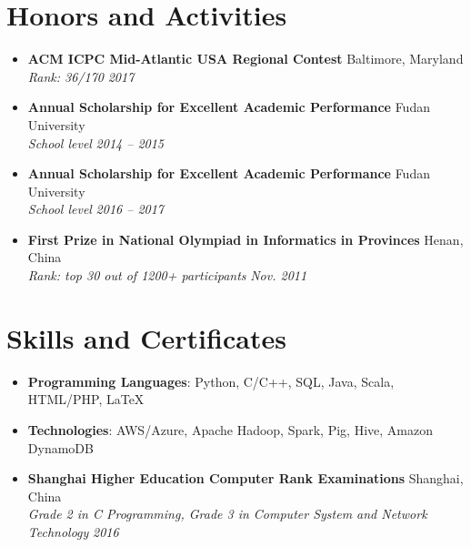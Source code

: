 \documentclass[letterpaper,11pt]{article}
\makeatletter
\newcommand{\resumeSubheading}[4]{
  \vspace{-5pt}\item
      \textbf{#1} \hfill #2 \\
      \textit{\small#3} \hfill \textit{\small #4}
  \vspace{-4pt}
}
\newcommand{\resumeSubHeadingListStart}{\begin{itemize}[leftmargin=*]}
\newcommand{\resumeSubHeadingListEnd}{\end{itemize}}
\makeatother
\begin{document}
\section{Honors and Activities}
  \resumeSubHeadingListStart
    \resumeSubheading
      {ACM ICPC Mid-Atlantic USA Regional Contest}{Baltimore, Maryland}
      {\emph{Rank: 36/170}}{2017}
    \resumeSubheading
      {Annual Scholarship for Excellent Academic Performance}{Fudan University}
      {School level}{2014 -- 2015}
    \resumeSubheading
      {Annual Scholarship for Excellent Academic Performance}{Fudan University}
      {School level}{2016 -- 2017}
    \resumeSubheading
      {First Prize in National Olympiad in Informatics in Provinces}{Henan, China}
      {\emph{Rank: top 30 out of 1200+ participants}}{Nov. 2011}
  \resumeSubHeadingListEnd

\section{Skills and Certificates}
  \resumeSubHeadingListStart
    \item{
      \textbf{Programming Languages}{: Python, C/C++, SQL, Java, Scala, HTML/PHP, \LaTeX}
    }
    \item{
      \textbf{Technologies}{: AWS/Azure, Apache Hadoop, Spark, Pig, Hive, Amazon DynamoDB}
    }
    \resumeSubheading{Shanghai Higher Education Computer Rank Examinations}{Shanghai, China}
        {\emph{Grade 2 in C Programming, Grade 3 in Computer System and Network Technology}}{2016}
  \resumeSubHeadingListEnd


\end{document}
